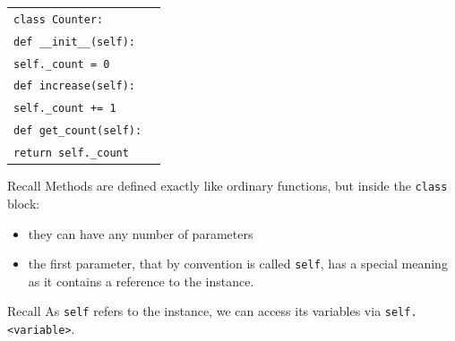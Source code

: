 \documentclass[t,handout,9pt]{beamer}
\begin{document}
%
\begin{frame}
\vfill
\begin{table}[]
\begin{flushleft}
\begin{tabular}{ll}
\texttt{class Counter:} &  \\
\texttt{\qquad def \_\_init\_\_(self):} & \\
\texttt{\qquad\qquad self.\_count = 0} & \\
\texttt{\qquad def increase(self):} & \\
\texttt{\qquad\qquad self.\_count += 1} & \\
\texttt{\qquad def get\_count(self):} & \\
\texttt{\qquad\qquad return self.\_count} & \\
\end{tabular}
\end{flushleft}
\end{table}
\vfill
\begin{block}{Recall}
Methods are defined exactly like ordinary functions, but inside the \texttt{class} block:
\begin{itemize}
	\item they can have any number of parameters
	\item the first parameter, that by convention is called \texttt{self}, has a special meaning as it contains a reference to the instance.
\end{itemize}
\end{block}
\begin{block}{Recall}
As \texttt{self} refers to the instance, we can access its variables via \texttt{self.<variable>}.
\end{block}
\vfill
\end{frame}
%
\end{document}
